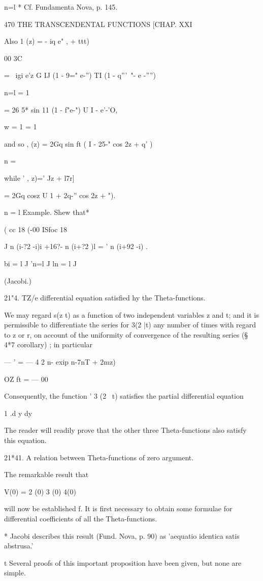 n=l * Cf. Fundamenta Nova, p. 145.

470 THE TRANSCENDENTAL FUNCTIONS [CHAP. XXI

Also 1 (z) = - iq e" , + ttt)

00 3C

= \ igi e'z G IJ (1 - 9=" e-'') TI (1 - q'''~"- e -'''')

n=l = 1

= 26 5* sin 11 (1 - f"e-") U I - e'-'O,

w = 1 = 1

and so , (z) = 2Gq sin ft ( I - 25-" cos 2z + q' )

n = \

while ' , z)=' Jz + l7r]

= 2Gq cosz U 1 + 2q-'' cos 2z + ").

n = l Example. Shew that*

( cc 18 (-00 ISfoc 18

J n (i-?2 -i)i +16?- n (i+?2 )l = ' n (i+92 -i) .

bi = l J 'n=l J ln = l J

(Jacobi.)

21"4. TZ/e differential equation satisfied hy the Theta-functions.

We may regard s(z t) as a function of two independent variables z and
t; and it is permissible to differentiate the series for 3(2 |t) any
number of times with regard to z or r, on account of the uniformity of
convergence of the resulting series (§ 4*7 corollary) ; in particular

— ' = — 4 2 n- exip n-7nT + 2mz)

OZ ft = — 00

Consequently, the function ' 3 (2 \ t) satisfies the partial
differential equation

1 .d y dy

The reader will readily prove that the other three Theta-functions
also satisfy this equation.

21*41. A relation between Theta-functions of zero argument.

The remarkable result that

V(0) = 2 (0) 3 (0) 4(0)

will now be established f. It is first necessary to obtain some
formulae for differential coefficients of all the Theta-functions.

* Jacobi describes this result (Fund. Nova, p. 90) as 'aequatio
identica satis abstrusa.'

t Several proofs of this important proposition have been given, but
none are simple.


